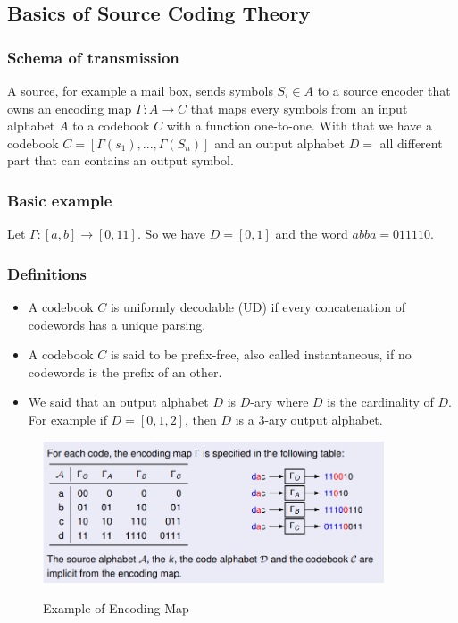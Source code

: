 \documentclass{article}
\begin{document}
\subsection{Basics of Source Coding Theory}
\subsubsection{Schema of transmission} A source, for example a mail
box, sends symbols $ S_i \in A $ to a source encoder that owns an encoding map $ \Gamma: A \rightarrow C $ that maps every symbols from an input alphabet $ A $ to a codebook $ C $ with a function one-to-one. With that we have a codebook $ C = [\Gamma(s_1), ..., \Gamma(S_n) ]$ and an output alphabet $ D = $ all different part that can contains an output symbol.

\subsubsection{Basic example} Let $ \Gamma: [a, b] \rightarrow [0, 11] $. So we have $ D = [0, 1] $ and the word $ abba = 011110$.

\subsubsection{Definitions}  
\begin{itemize}
\item A codebook $ C $ is uniformly decodable (UD) if every concatenation of codewords has a unique parsing.
\item A codebook $ C $ is said to be prefix-free, also called instantaneous, if no codewords is the prefix of an other.
\item We said that an output alphabet $ D $ is $ D $-ary where $ D $ is the cardinality of $ D $. For example if $ D = [0, 1, 2] $, then $ D $ is a 3-ary output alphabet.
\end{itemize}

\begin{figure}[h]
  \hfill\includegraphics[width=0.9\textwidth]{encodingmap.png}\hspace*{\fill}
  \label{fig:encodingmap}
  
  \caption{Example of Encoding Map}
\end{figure}
\end{document}
